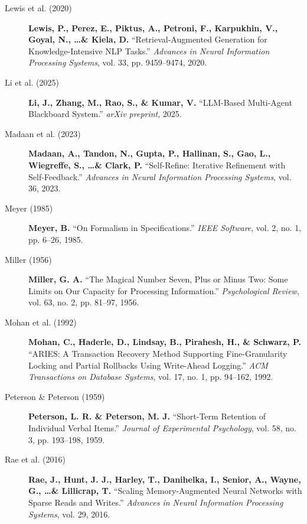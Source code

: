 \begin{description}
    \item[Lewis et al. (2020)] \textbf{Lewis, P., Perez, E., Piktus, A., Petroni, F., Karpukhin, V., Goyal, N., \dots \& Kiela, D.} ``Retrieval-Augmented Generation for Knowledge-Intensive NLP Tasks.'' \textit{Advances in Neural Information Processing Systems}, vol. 33, pp. 9459--9474, 2020. 

    \item[Li et al. (2025)] \textbf{Li, J., Zhang, M., Rao, S., \& Kumar, V.} ``LLM-Based Multi-Agent Blackboard System.'' \textit{arXiv preprint}, 2025. 
    
    \item[Madaan et al. (2023)] \textbf{Madaan, A., Tandon, N., Gupta, P., Hallinan, S., Gao, L., Wiegreffe, S., \dots \& Clark, P.} ``Self-Refine: Iterative Refinement with Self-Feedback.'' \textit{Advances in Neural Information Processing Systems}, vol. 36, 2023. 
    
    \item[Meyer (1985)] \textbf{Meyer, B.} ``On Formalism in Specifications.'' \textit{IEEE Software}, vol. 2, no. 1, pp. 6--26, 1985. 
    
    \item[Miller (1956)] \textbf{Miller, G. A.} ``The Magical Number Seven, Plus or Minus Two: Some Limits on Our Capacity for Processing Information.'' \textit{Psychological Review}, vol. 63, no. 2, pp. 81--97, 1956. 
    
    \item[Mohan et al. (1992)] \textbf{Mohan, C., Haderle, D., Lindsay, B., Pirahesh, H., \& Schwarz, P.} ``ARIES: A Transaction Recovery Method Supporting Fine-Granularity Locking and Partial Rollbacks Using Write-Ahead Logging.'' \textit{ACM Transactions on Database Systems}, vol. 17, no. 1, pp. 94--162, 1992. 
    
    \item[Peterson \& Peterson (1959)] \textbf{Peterson, L. R. \& Peterson, M. J.} ``Short-Term Retention of Individual Verbal Items.'' \textit{Journal of Experimental Psychology}, vol. 58, no. 3, pp. 193--198, 1959. 
    
    \item[Rae et al. (2016)] \textbf{Rae, J., Hunt, J. J., Harley, T., Danihelka, I., Senior, A., Wayne, G., \dots \& Lillicrap, T.} ``Scaling Memory-Augmented Neural Networks with Sparse Reads and Writes.'' \textit{Advances in Neural Information Processing Systems}, vol. 29, 2016. 
    

\end{description}
